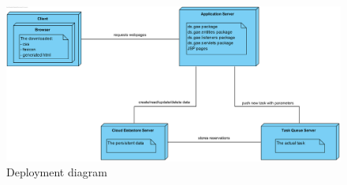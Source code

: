 \documentclass{ds-report}
\begin{document}
		\clearpage

\begin{figure}
  \includegraphics[width=\linewidth]{GAE_opdracht_2_deployment.png}
  \caption{Deployment diagram}
  \label{fig:deployment_diagram}
\end{figure}	

	
	\clearpage


	
\end{document}
